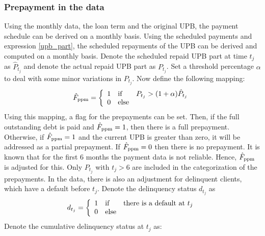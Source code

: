     \subsubsection{Prepayment in the data}
        Using the monthly data, the loan term and the original UPB, 
        the payment schedule can be derived on a monthly basis. 
        Using the scheduled payments and expression \eqref{upb_part}, 
        the scheduled repayments of the UPB can be derived and 
        computed on a monthly basis.
        Denote the scheduled repaid UPB part at time $t_j$ as 
        $\hat{P}_{t_j}$ and denote the actual repaid UPB part 
        as $P_{t_j}$. Set a threshold percentage $\alpha$ 
        to deal with some minor variations in $P_{t_j}$.
        Now define the following mapping: 
        \begin{equation}
            \hat{F}_{\text{ppm}} = \left\{
                \begin{array}{l l l l l }
                    1 & \text{if} &
                    P_{t_j} > (1 + \alpha) \hat{P}_{t_j} \\ 
                    0 & \text{else}
                \end{array}
            \right.
        \end{equation}
        Using this mapping, a flag for the prepayments can 
        be set. Then, if the full outstanding debt is paid
        and $\hat{F}_{\text{ppm}} = 1$, then there is a full prepayment. 
        Otherwise, if $\hat{F}_{\text{ppm}} = 1$ and the current 
        UPB is greater than zero, it will be addressed as a 
        partial prepayment. If $\hat{F}_{\text{ppm}} = 0$ then 
        there is no prepayment. It is known that for the 
        first 6 months the payment data is not reliable. 
        Hence, $\hat{F}_{\text{ppm}}$ is adjusted for this. Only 
        $P_{t_j}$ with $t_j > 6$ are included in the 
        categorization of the prepayments. 
        In the data, there is also an adjustment for delinquent 
        clients, which have a default before $t_j$. 
        Denote the delinquency status $d_{t_j}$ as
        \begin{equation}
            d_{t_j} = \left\{
                \begin{array}{l l l l l}
                    1 & \text{if} & \text{there is a default at } t_j \\
                    0 & \text{else}
                \end{array}
            \right.
        \end{equation}
        Denote the cumulative delinquency status at $t_j$ as:

